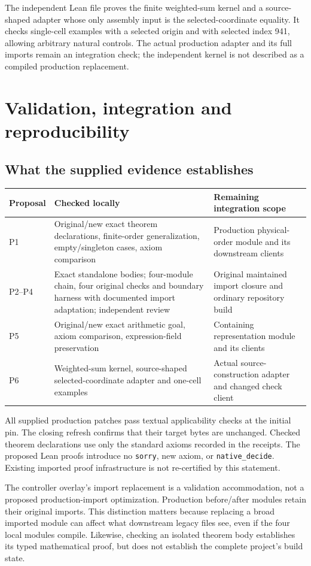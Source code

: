 \documentclass[11pt]{article}
\newcommand{\code}[1]{\nolinkurl{#1}}
\begin{document}
The independent Lean file proves the finite weighted-sum kernel and a source-shaped adapter whose only assembly input is the selected-coordinate equality. It checks single-cell examples with a selected origin and with selected index 941, allowing arbitrary natural controls. The actual production adapter and its full imports remain an integration check; the independent kernel is not described as a compiled production replacement.

\section{Validation, integration and reproducibility}

\subsection*{What the supplied evidence establishes}

\begin{tabularx}{\linewidth}{@{}lYY@{}}
\toprule
Proposal & Checked locally & Remaining integration scope\\
\midrule
P1 & Original/new exact theorem declarations, finite-order generalization, empty/singleton cases, axiom comparison & Production physical-order module and its downstream clients\\
P2--P4 & Exact standalone bodies; four-module chain, four original checks and boundary harness with documented import adaptation; independent review & Original maintained import closure and ordinary repository build\\
P5 & Original/new exact arithmetic goal, axiom comparison, expression-field preservation & Containing representation module and its clients\\
P6 & Weighted-sum kernel, source-shaped selected-coordinate adapter and one-cell examples & Actual source-construction adapter and changed check client\\
\bottomrule
\end{tabularx}

All supplied production patches pass textual applicability checks at the initial pin. The closing refresh confirms that their target bytes are unchanged. Checked theorem declarations use only the standard axioms recorded in the receipts. The proposed Lean proofs introduce no \code{sorry}, new axiom, or \code{native_decide}. Existing imported proof infrastructure is not re-certified by this statement.

The controller overlay's import replacement is a validation accommodation, not a proposed production-import optimization. Production before/after modules retain their original imports. This distinction matters because replacing a broad imported module can affect what downstream legacy files see, even if the four local modules compile. Likewise, checking an isolated theorem body establishes its typed mathematical proof, but does not establish the complete project's build state.
\end{document}
